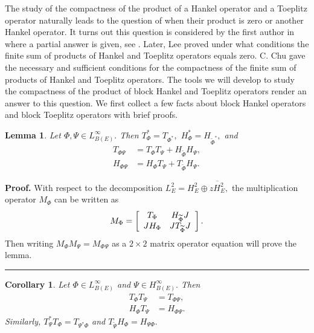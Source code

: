 \documentclass{article}%
\newtheorem{corollary}[theorem]{Corollary}
\newtheorem{lemma}[theorem]{Lemma}
\newenvironment{proof}[1][Proof]{\noindent\textbf{#1.} }{\ \rule{0.5em}{0.5em}}
\begin{document}
\label{Section 2}

The study of the compactness of the product of a Hankel operator and a
Toeplitz operator naturally leads to the question of when their product is
zero or another Hankel operator. It turns out this question is considered by
the first author in \cite{GuJOT} where a partial answer is given, see
\cite{Ding}. Later, Lee \cite{Lee} proved under what conditions the finite sum
of products of Hankel and Toeplitz operators equals zero. C. Chu \cite{ChengChu20} gave the necessary and sufficient conditions for the compactness of the
finite sum of products of Hankel and Toeplitz operators. The tools we will
develop to study the compactness of the product of block Hankel and Toeplitz
operators render an answer to this question. We first collect a few facts
about block Hankel operators and block Toeplitz operators with brief proofs.

\begin{lemma}
Let $\Phi,\Psi\in L_{B(E)}^{\infty}.$ Then $T_{\Phi}^{\ast}=T_{\Phi^{\ast}},$
$H_{\Phi}^{\ast}=H_{\widetilde{\Phi}^{\ast}},$ and%
\begin{align}
T_{\Phi\Psi}  &  =T_{\Phi}T_{\Psi}+H_{\widetilde{\Phi}}H_{\Psi},\label{t1}\\
H_{\Phi\Psi}  &  =H_{\Phi}T_{\Psi}+T_{\widetilde{\Phi}}H_{\Psi}. \label{h1}%
\end{align}

\end{lemma}

\begin{proof}
With respect to the decomposition $L_{E}^{2}=H_{E}^{2}\oplus\overline
{zH_{E}^{2}},$ the multiplication operator $M_{\Phi}$ can be written as%
\[
M_{\Phi}=\left[
\begin{array}
[c]{cc}%
T_{\Phi} & H_{\widetilde{\Phi}}J\\
JH_{\Phi} & JT_{\widetilde{\Phi}}J
\end{array}
\right]  .
\]
Then writing $M_{\Phi}M_{\Psi}=M_{\Phi}{}_{\Psi}$ as a $2\times2$ matrix
operator equation will prove the lemma.
\end{proof}

\begin{corollary}
\label{cort2h2}Let $\Phi\in L_{B(E)}^{\infty}$ and $\Psi\in H_{B(E)}^{\infty
}.$ Then%
\begin{align}
T_{\Phi}T_{\Psi}  &  =T_{\Phi\Psi},\label{t2}\\
H_{\Phi}T_{\Psi}  &  =H_{\Phi\Psi}. \label{h2}%
\end{align}
Similarly, $T_{\Psi}^{\ast}T_{\Phi}=T_{\Psi^{\ast}\Phi}$ and $T_{\widetilde
{\Psi}}H_{\Phi}=H_{\Psi\Phi}.$
\end{corollary}
\end{document}
